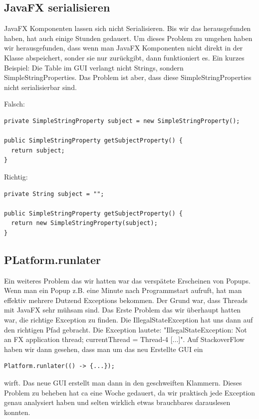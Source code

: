 \documentclass[11pt,titelpage]{scrartcl}
\begin{document}
\subsection{JavaFX serialisieren}
JavaFX Komponenten lassen sich nicht Serialisieren. Bis wir das herausgefunden haben, hat auch einige Stunden gedauert. Um dieses Problem zu umgehen haben wir herausgefunden, dass
wenn man JavaFX Komponenten nicht direkt in der Klasse abspeichert, sonder sie nur zurückgibt, dann funktioniert es. Ein kurzes Beispiel:
Die Table im GUI verlangt nicht Strings, sondern SimpleStringProperties. Das Problem ist aber, dass diese SimpleStringProperties nicht serialisierbar sind.

Falsch:
\begin{lstlisting}
private SimpleStringProperty subject = new SimpleStringProperty();

public SimpleStringProperty getSubjectProperty() {
  return subject;
}
\end{lstlisting}

Richtig:
\begin{lstlisting}
private String subject = "";

public SimpleStringProperty getSubjectProperty() {
  return new SimpleStringProperty(subject);
}
\end{lstlisting}

\subsection{PLatform.runlater}
Ein weiteres Problem das wir hatten war das verspätete Erscheinen von Popups. Wenn man ein Popup z.B. eine Minute nach Programmstart aufruft, hat man effektiv mehrere Dutzend Exceptions bekommen.
Der Grund war, dass Threads mit JavaFX sehr mühsam sind. Das Erste Problem das wir überhaupt hatten war, die richtige Exception zu finden. Die IllegalStateException hat uns dann auf den richtigen Pfad gebracht.
Die Exception lautete: "IllegalStateException: Not an FX application thread; currentThread = Thread-4 [...]". Auf StackoverFlow haben wir dann gesehen, dass man um das neu Erstellte GUI ein
\begin{lstlisting}
Platform.runlater(() -> {...});
\end{lstlisting}
wirft. Das neue GUI erstellt man dann in den geschweiften Klammern.
Dieses Problem zu beheben hat ca eine Woche gedauert, da wir praktisch jede Exception genau analysiert haben und selten wirklich etwas brauchbares darauslesen konnten.
\end{document}
